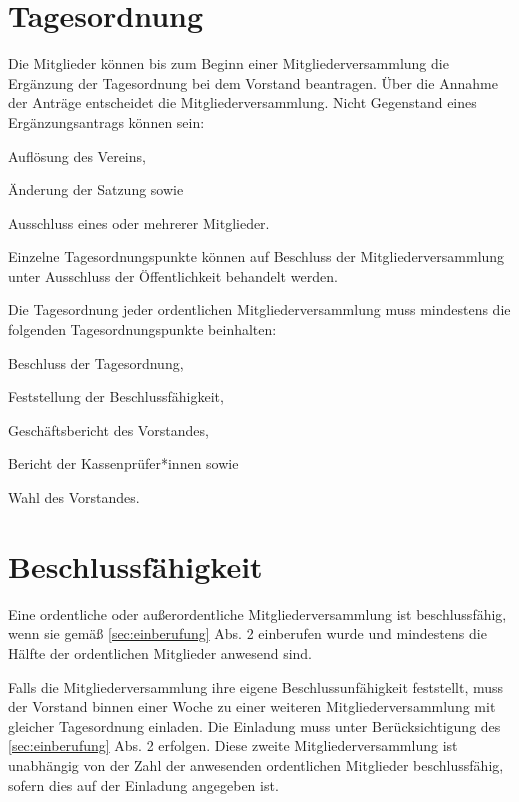 \section{Tagesordnung}
\begin{absätze}
    \item Die Mitglieder können bis zum Beginn einer Mitgliederversammlung die Ergänzung der Tagesordnung bei dem Vorstand beantragen. Über die Annahme der Anträge entscheidet die Mitgliederversammlung. Nicht Gegenstand eines Ergänzungsantrags können sein:
    \begin{sätze}
        \item Auflösung des Vereins,
        \item Änderung der Satzung sowie
        \item Ausschluss eines oder mehrerer Mitglieder.
    \end{sätze}
    \item Einzelne Tagesordnungspunkte können auf Beschluss der Mitgliederversammlung unter Ausschluss der Öffentlichkeit behandelt werden.
    \item Die Tagesordnung jeder ordentlichen Mitgliederversammlung muss mindestens die folgenden Tagesordnungspunkte beinhalten:
    \begin{sätze}
        \item Beschluss der Tagesordnung,
        \item Feststellung der Beschlussfähigkeit,
        \item Geschäftsbericht des Vorstandes,
        \item Bericht der Kassenprüfer*innen sowie
        \item Wahl des Vorstandes.
    \end{sätze}
\end{absätze}

\section{Beschlussfähigkeit}
\begin{absätze}
    \item Eine ordentliche oder außerordentliche Mitgliederversammlung ist beschlussfähig, wenn sie gemäß \ref{sec:einberufung} Abs. 2 einberufen wurde und mindestens die Hälfte der ordentlichen Mitglieder anwesend sind.
    \item Falls die Mitgliederversammlung ihre eigene Beschlussunfähigkeit feststellt, muss der Vorstand binnen einer Woche zu einer weiteren Mitgliederversammlung mit gleicher Tagesordnung einladen. Die Einladung muss unter Berücksichtigung des \ref{sec:einberufung} Abs. 2 erfolgen. Diese zweite Mitgliederversammlung ist unabhängig von der Zahl der anwesenden ordentlichen Mitglieder beschlussfähig, sofern dies auf der Einladung angegeben ist.
\end{absätze}

